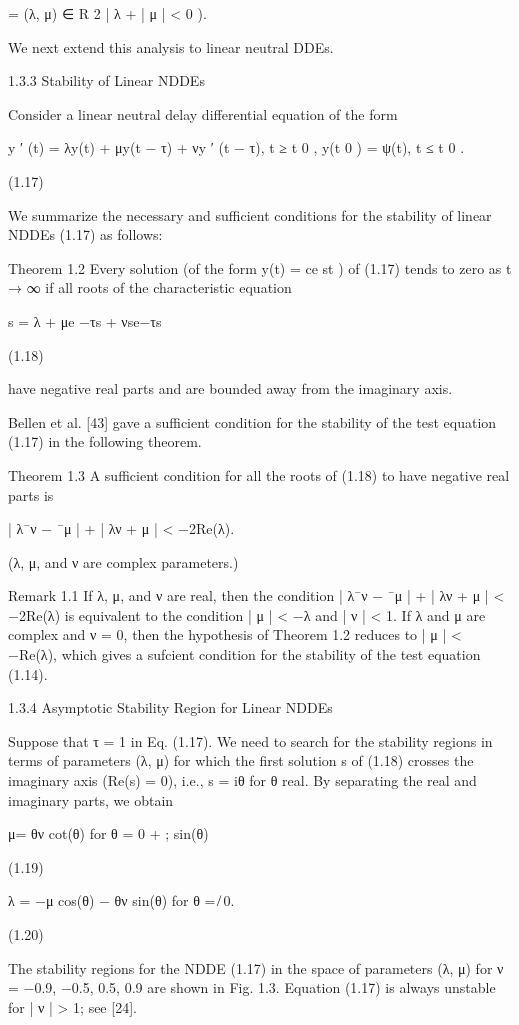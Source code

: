 \documentclass[12pt]{article}
\begin{document}
= { (λ, μ) ∈ R 2 | λ + | μ | < 0 } ).

We next extend this analysis to linear neutral DDEs.

1.3.3 Stability of Linear NDDEs

Consider a linear neutral delay differential equation of the form

y ′ (t) = λy(t) + μy(t − τ) + νy ′ (t − τ), t ≥ t 0 , y(t 0 ) = ψ(t), t ≤ t 0 .

(1.17)

We summarize the necessary and sufficient conditions for the stability of linear NDDEs (1.17) as follows:

Theorem 1.2 Every solution (of the form y(t) = ce st ) of (1.17) tends to zero as t → ∞ if all roots of the characteristic equation

s = λ + μe −τs + νse−τs 

(1.18)

have negative real parts and are bounded away from the imaginary axis.

Bellen et al. [43] gave a sufficient condition for the stability of the test equation (1.17) in the following theorem.

Theorem 1.3 A sufficient condition for all the roots of (1.18) to have negative real parts is

| λ¯ν − ¯μ | + | λν + μ | < −2Re(λ).

(λ, μ, and ν are complex parameters.)

Remark 1.1 If λ, μ, and ν are real, then the condition | λ¯ν − ¯μ | + | λν + μ | < −2Re(λ) is equivalent to the condition | μ | < −λ and | 
ν | < 1. If λ and μ are complex and ν = 0, then the hypothesis of Theorem 1.2 reduces to | μ | < −Re(λ), which gives a sufcient condition 
for the stability of the test equation (1.14).

1.3.4 Asymptotic Stability Region for Linear NDDEs

Suppose that τ = 1 in Eq. (1.17). We need to search for the stability regions in terms of parameters (λ, μ) for which the ﬁrst solution s of 
(1.18) crosses the imaginary axis (Re(s) = 0), i.e., s = iθ for θ real. By separating the real and imaginary parts, we obtain

μ= θν cot(θ) for θ = 0 + ; sin(θ)

(1.19)

λ = −μ cos(θ) − θν sin(θ) for θ = ̸ 0.

(1.20)

The stability regions for the NDDE (1.17) in the space of parameters (λ, μ) for ν = −0.9, −0.5, 0.5, 0.9 are shown in Fig. 1.3. Equation 
(1.17) is always unstable for | ν | > 1; see [24].
\end{document}
